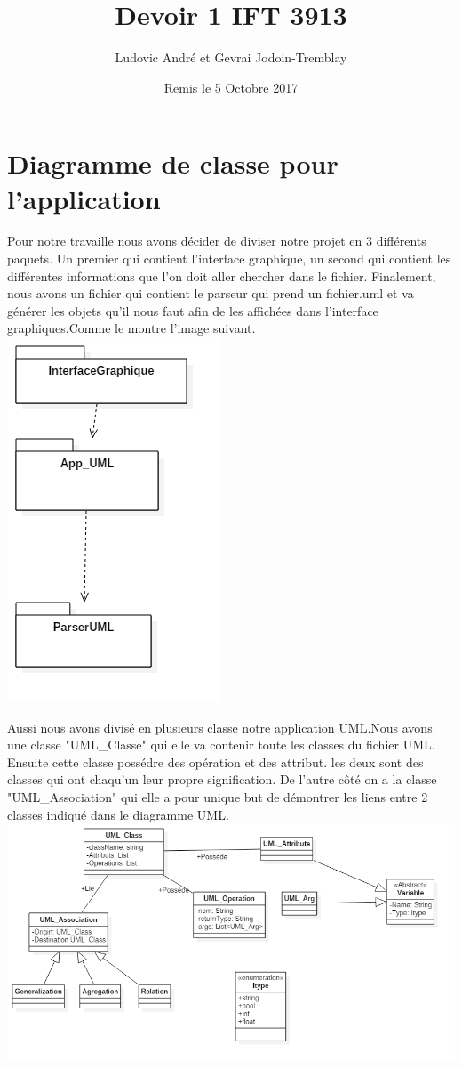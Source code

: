 \documentclass[letter,french]{report}
\begin{document}
\title{Devoir 1 IFT 3913}
\author{Ludovic André et Gevrai Jodoin-Tremblay}
\date{Remis le 5 Octobre 2017}
\maketitle

\section*{Diagramme de classe pour l'application}
Pour notre travaille nous avons décider de diviser notre projet en 3 différents paquets. Un premier qui contient l'interface graphique, un second qui contient les différentes informations que l'on doit aller chercher dans le fichier. Finalement, nous avons un fichier qui contient le parseur qui prend un fichier.uml et va générer les objets qu'il nous faut afin de les affichées dans l'interface graphiques.Comme le montre l'image suivant.
\newline 
\includegraphics[scale=.3]{DiagrammePaquet.png}

Aussi nous avons divisé en plusieurs classe notre application UML.Nous avons une classe  "UML\_Classe" qui elle va contenir toute les classes du fichier UML. Ensuite cette classe possédre des opération et des attribut. les deux sont des classes qui ont chaqu'un leur propre signification. De l'autre côté on a la classe "UML\_Association" qui elle a pour unique but de démontrer les liens entre 2 classes indiqué dans le diagramme UML.
\newline
\includegraphics[scale=.4]{DiagrammeClasse.png}
\end{document}
